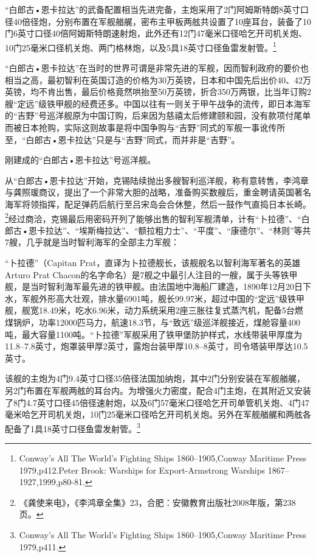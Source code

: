 \documentclass[12pt,UTF8]{ctexbook}
\begin{document}
“白郎古•恩卡拉达”的武备配置相当先进完备，主炮采用了2门阿姆斯特朗8英寸口径40倍径炮，分别布置在军舰艏艉，密布主甲板两舷共设置了10座耳台，装备了10门6英寸口径40倍阿姆斯特朗速射炮，此外还有12门47毫米口径哈乞开司机关炮、10门25毫米口径机关炮、两门格林炮，以及5具18英寸口径鱼雷发射管。\footnote{Conway's All The World's Fighting Ships 1860--1905,Conway Maritime Press 1979,p412.Peter Brook: Warships for Export-Armstrong Warships 1867--1927,1999,p80-81.}

“白郎古•恩卡拉达”在当时的世界可谓是非常先进的军舰，因而智利政府的要价也相当之高，最初智利在英国订造的价格为30万英镑，日本和中国先后出价40、42万英镑，均不肯出售，最后价格竟然哄抬至50万英镑，折合350万两银，比当年订购2艘“定远”级铁甲舰的经费还多。中国以往有一则关于甲午战争的流传，即日本海军的“吉野”号巡洋舰原为中国订购，后来因为慈禧太后修建颐和园，没有款项付尾单而被日本抢购，实际这则故事是将中国争购与“吉野”同式的军舰一事讹传所至，“白郎古•恩卡拉达”只是与“吉野”同式，而并非是“吉野”。

刚建成的“白郎古•恩卡拉达”号巡洋舰。

从“白郎古•恩卡拉达”开始，克锡陆续抛出多艘智利巡洋舰，称有意转售，李鸿章与龚照瑗商议，提出了一个非常大胆的战略，准备购买数艘后，重金聘请英国著名海军将领指挥，配足弹药后航行至吕宋岛会合休整，然后一鼓作气直捣日本长崎。\footnote{《龚使来电》，《李鸿章全集》23，合肥：安徽教育出版社2008年版，第238页。}经过商洽，克锡最后用密码开列了能够出售的智利军舰清单，计有“卜拉德”、“白郎古•恩卡拉达”、“埃斯梅拉达”、“额拉粗力士”、“平度”、“康德尔”、“林则”等共7艘，几乎就是当时智利海军的全部主力军舰：

“卜拉德”（Capitan Prat，直译为卜拉德舰长，该舰舰名以智利海军著名的英雄Arturo Prat Chacon的名字命名）是7舰之中最引人注目的一艘，属于头等铁甲舰，是当时智利海军最先进的铁甲舰。由法国地中海船厂建造，1890年12月20日下水，军舰外形高大壮观，排水量6901吨，舰长99.97米，超过中国的“定远”级铁甲舰，舰宽18.49米，吃水6.96米，动力系统采用2座三胀往复式蒸汽机，配备5台燃煤锅炉，功率12000匹马力，航速18.3节，与“致远”级巡洋舰接近，煤舱容量400吨，最大容量1100吨。“卜拉德”军舰采用了铁甲堡防护样式，水线带装甲厚度为11.8--7.8英寸，炮罩装甲厚2英寸，露炮台装甲厚10.8--8英寸，司令塔装甲厚达10.5英寸。

该舰的主炮为4门9.4英寸口径35倍径法国加纳炮，其中2门分别安装在军舰艏艉，另2门布置在军舰两舷的耳台内。为增强火力密度，配合4门主炮，在其附近又安装了8门4.7英寸口径45倍径速射炮，以及6门57毫米口径哈乞开司单管机关炮、4门47毫米哈乞开司机关炮，10门25毫米口径哈乞开司机关炮。另外在军舰艏艉和两舷各配备了1具18英寸口径鱼雷发射管。\footnote{Conway's All The World's Fighting Ships 1860--1905,Conway Maritime Press 1979,p411.}
\end{document}
